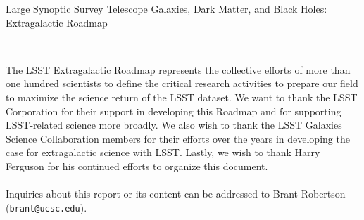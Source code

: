 \documentclass[11pt,fleqn]{book} %
\begin{document}

\begingroup
\thispagestyle{empty}
{\Huge Large Synoptic Survey Telescope} 
\linebreak 
\linebreak 
{\Huge Galaxies, Dark Matter, and Black Holes: Extragalactic Roadmap}
\linebreak
\linebreak
{\centering


}
\vfill
\endgroup

\newpage
\thispagestyle{empty}
\noindent
\noindent
\noindent
\\
\noindent

The LSST Extragalactic Roadmap represents the collective efforts of more than one hundred scientists to define the critical research activities to prepare our field to maximize
the science return of the LSST dataset. We want to thank the LSST Corporation for their
support in developing this Roadmap and for supporting LSST-related science more broadly.
We also wish to thank the LSST Galaxies Science Collaboration members for their efforts
over the years in developing the case for extragalactic science with LSST. Lastly, we
wish to thank Harry Ferguson for his continued efforts to organize this document.\\\\
Inquiries about this report or its content can be addressed to Brant Robertson ({\tt brant@ucsc.edu}).
\end{document}
